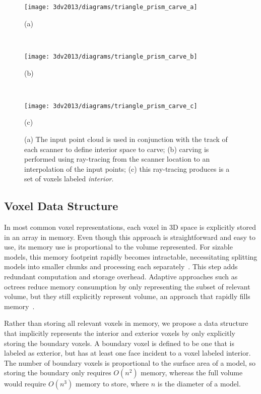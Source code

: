 \documentclass[12pt,onecolumn,oneside]{book}
\begin{document}
\begin{figure}[p]

  \centering
  \begin{minipage}[b]{0.45\linewidth}
  \centerline{\texttt{[image: 3dv2013/diagrams/triangle\_prism\_carve\_a]}}
  \centerline{(a)}\medskip
  \end{minipage}\\
  \begin{minipage}[b]{0.45\linewidth}
  \centerline{\texttt{[image: 3dv2013/diagrams/triangle\_prism\_carve\_b]}}
  \centerline{(b)}\medskip
  \end{minipage}\\
  \begin{minipage}[b]{0.45\linewidth}
  \centerline{\texttt{[image: 3dv2013/diagrams/triangle\_prism\_carve\_c]}}
  \centerline{(c)}\medskip
  \end{minipage}

\caption[Method of interpolating scans to carve voxels.]{(a) The input point cloud is used in conjunction with the track of each scanner to define interior space to carve; (b) carving is performed using ray-tracing from the scanner location to an interpolation of the input points; (c) this ray-tracing produces is a set of voxels labeled {\it interior}.}
\label{fig:voxel_carving}
\end{figure}

\subsection{Voxel Data Structure}
\label{ssec:voxel_carving_data_structure}

In most common voxel representations, each voxel in 3D space is explicitly stored in an array in memory.  Even though this approach is straightforward and easy to use, its memory use is proportional to the volume represented.  For sizable models, this memory footprint rapidly becomes intractable, necessitating splitting models into smaller chunks and processing each separately~\cite{Carving}.  This step adds redundant computation and storage overhead.  Adaptive approaches such as octrees reduce memory consumption by only representing the subset of relevant volume, but they still explicitly represent volume, an approach that rapidly fills memory~\cite{OctreeSculpting,Yang05}.

Rather than storing all relevant voxels in memory, we propose a data structure that implicitly represents the interior and exterior voxels by only explicitly storing the boundary voxels.  A boundary voxel is defined to be one that is labeled as exterior, but has at least one face incident to a voxel labeled interior.  The number of boundary voxels is proportional to the surface area of a model, so storing the boundary only requires $O(n^2)$ memory, whereas the full volume would require $O(n^3)$ memory to store, where $n$ is the diameter of a model.
\end{document}
